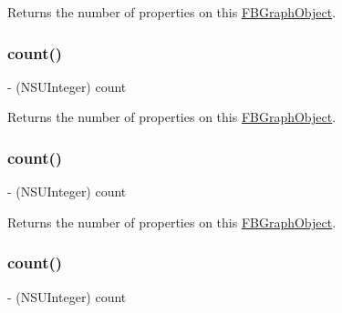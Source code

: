 Returns the number of properties on this {\ttfamily \hyperlink{interfaceFBGraphObject}{F\+B\+Graph\+Object}}. \mbox{\label{protocolFBGraphObject-p_aaf8c8d696ae643db005f3562ab51fca1}} 
\subsubsection{\texorpdfstring{count()}{count()}\hspace{0.1cm}{\footnotesize\ttfamily [2/5]}}
{\footnotesize\ttfamily -\/ (N\+S\+U\+Integer) count \begin{DoxyParamCaption}{ }\end{DoxyParamCaption}}

Returns the number of properties on this {\ttfamily \hyperlink{interfaceFBGraphObject}{F\+B\+Graph\+Object}}. \mbox{\label{protocolFBGraphObject-p_aaf8c8d696ae643db005f3562ab51fca1}} 
\subsubsection{\texorpdfstring{count()}{count()}\hspace{0.1cm}{\footnotesize\ttfamily [3/5]}}
{\footnotesize\ttfamily -\/ (N\+S\+U\+Integer) count \begin{DoxyParamCaption}{ }\end{DoxyParamCaption}}

Returns the number of properties on this {\ttfamily \hyperlink{interfaceFBGraphObject}{F\+B\+Graph\+Object}}. \mbox{\label{protocolFBGraphObject-p_aaf8c8d696ae643db005f3562ab51fca1}} 
\subsubsection{\texorpdfstring{count()}{count()}\hspace{0.1cm}{\footnotesize\ttfamily [4/5]}}
{\footnotesize\ttfamily -\/ (N\+S\+U\+Integer) count \begin{DoxyParamCaption}{ }\end{DoxyParamCaption}}

